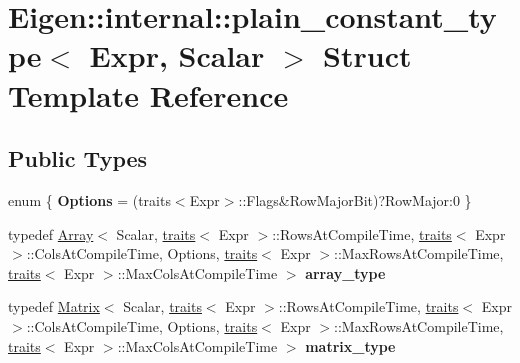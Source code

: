 \hypertarget{struct_eigen_1_1internal_1_1plain__constant__type}{}\section{Eigen\+::internal\+::plain\+\_\+constant\+\_\+type$<$ Expr, Scalar $>$ Struct Template Reference}
\label{struct_eigen_1_1internal_1_1plain__constant__type}
\subsection*{Public Types}
\begin{DoxyCompactItemize}
\item 
\mbox{\label{struct_eigen_1_1internal_1_1plain__constant__type_a5df49de496776fecdfd2559372590e41}} 
enum \{ {\bfseries Options} = (traits$<$Expr$>$\+::Flags\&Row\+Major\+Bit)?Row\+Major\+:0
 \}
\item 
\mbox{\label{struct_eigen_1_1internal_1_1plain__constant__type_ace743ed455e55302961c46cbcf246eba}} 
typedef \mbox{\hyperlink{class_eigen_1_1_array}{Array}}$<$ Scalar, \mbox{\hyperlink{struct_eigen_1_1internal_1_1traits}{traits}}$<$ Expr $>$\+::Rows\+At\+Compile\+Time, \mbox{\hyperlink{struct_eigen_1_1internal_1_1traits}{traits}}$<$ Expr $>$\+::Cols\+At\+Compile\+Time, Options, \mbox{\hyperlink{struct_eigen_1_1internal_1_1traits}{traits}}$<$ Expr $>$\+::Max\+Rows\+At\+Compile\+Time, \mbox{\hyperlink{struct_eigen_1_1internal_1_1traits}{traits}}$<$ Expr $>$\+::Max\+Cols\+At\+Compile\+Time $>$ {\bfseries array\+\_\+type}
\item 
\mbox{\label{struct_eigen_1_1internal_1_1plain__constant__type_a3bf684861bb8d5a498cb07986637d61f}} 
typedef \mbox{\hyperlink{class_eigen_1_1_matrix}{Matrix}}$<$ Scalar, \mbox{\hyperlink{struct_eigen_1_1internal_1_1traits}{traits}}$<$ Expr $>$\+::Rows\+At\+Compile\+Time, \mbox{\hyperlink{struct_eigen_1_1internal_1_1traits}{traits}}$<$ Expr $>$\+::Cols\+At\+Compile\+Time, Options, \mbox{\hyperlink{struct_eigen_1_1internal_1_1traits}{traits}}$<$ Expr $>$\+::Max\+Rows\+At\+Compile\+Time, \mbox{\hyperlink{struct_eigen_1_1internal_1_1traits}{traits}}$<$ Expr $>$\+::Max\+Cols\+At\+Compile\+Time $>$ {\bfseries matrix\+\_\+type}

\end{DoxyCompactItemize}
